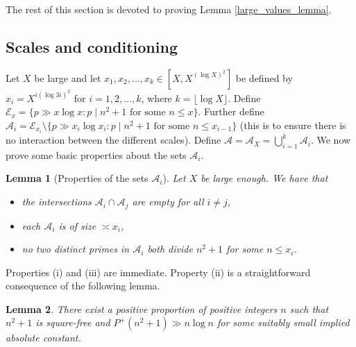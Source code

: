 \documentclass[11pts]{amsart}
\numberwithin{equation}{section}
\newtheorem{lem}{Lemma}[section]
\begin{document}
The rest of this section is devoted to proving Lemma \ref{large_values_lemma}.

\subsection{Scales and conditioning}

Let $X$ be large and let $x_1, x_2, \ldots, x_k\in [X, X^{(\log X)^2}]$ be defined by $x_i = X^{i(\log 3i)^2}$ for $i=1, 2, \ldots, k$, where $k = \lfloor \log X\rfloor$. Define $\mathcal E_{x} = \{p\gg x\log x : p \mid n^2 + 1 \text{ for some } n\leq x\}$. Further define $\mathcal A_i = \mathcal E_{x_i} \setminus \{p\gg x_i\log x_i : p\mid n^2 + 1 \text{ for some } n\leq x_{i-1}\}$ (this is to ensure there is no interaction between the different scales). Define $\mathcal A = \mathcal A_X = \bigcup_{i=1}^k \mathcal A_i$. We now prove some basic properties about the sets $\mathcal A_i$. 

\begin{lem}[Properties of the sets $\mathcal A_i$] Let $X$  be large enough. We have that \begin{itemize}
    \item[(i)] the intersections $\mathcal A_i\cap \mathcal A_j$ are empty for all $i\neq j$,
    \item[(ii)] each $\mathcal A_i$ is of size $\asymp x_i$,
    \item[(iii)] no two distinct primes in $\mathcal A_i$ both divide $n^2 + 1$ for some $n\leq x_i$. 
\end{itemize} \label{AsetProperties}
\end{lem}

Properties (i) and (iii) are immediate. Property (ii) is a straightforward consequence of the following lemma. 

\begin{lem}\label{posProp}
    There exist a positive proportion of positive integers $n$ such that $n^2 + 1$ is square-free and $P^+(n^2 + 1)\gg n\log n$ for some suitably small implied absolute constant.
\end{lem}
\end{document}
